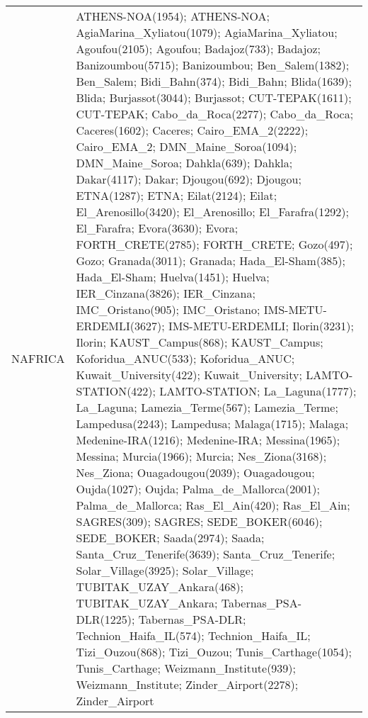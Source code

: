 \documentclass[journal abbreviation, manuscript]{copernicus}
\begin{document}
\begin{table}
\begin{tabularx}{\textwidth}{lX}
                                                                                                                                                                                                                                                                               \\
  NAFRICA   & ATHENS-NOA(1954); ATHENS-NOA; AgiaMarina\_Xyliatou(1079); AgiaMarina\_Xyliatou; Agoufou(2105); Agoufou; Badajoz(733); Badajoz; Banizoumbou(5715); Banizoumbou; Ben\_Salem(1382); Ben\_Salem; Bidi\_Bahn(374); Bidi\_Bahn; Blida(1639); Blida; Burjassot(3044); Burjassot; CUT-TEPAK(1611); CUT-TEPAK; Cabo\_da\_Roca(2277); Cabo\_da\_Roca; Caceres(1602); Caceres; Cairo\_EMA\_2(2222); Cairo\_EMA\_2; DMN\_Maine\_Soroa(1094); DMN\_Maine\_Soroa; Dahkla(639); Dahkla; Dakar(4117); Dakar; Djougou(692); Djougou; ETNA(1287); ETNA; Eilat(2124); Eilat; El\_Arenosillo(3420); El\_Arenosillo; El\_Farafra(1292); El\_Farafra; Evora(3630); Evora; FORTH\_CRETE(2785); FORTH\_CRETE; Gozo(497); Gozo; Granada(3011); Granada; Hada\_El-Sham(385); Hada\_El-Sham; Huelva(1451); Huelva; IER\_Cinzana(3826); IER\_Cinzana; IMC\_Oristano(905); IMC\_Oristano; IMS-METU-ERDEMLI(3627); IMS-METU-ERDEMLI; Ilorin(3231); Ilorin; KAUST\_Campus(868); KAUST\_Campus; Koforidua\_ANUC(533); Koforidua\_ANUC; Kuwait\_University(422); Kuwait\_University; LAMTO-STATION(422); LAMTO-STATION; La\_Laguna(1777); La\_Laguna; Lamezia\_Terme(567); Lamezia\_Terme; Lampedusa(2243); Lampedusa; Malaga(1715); Malaga; Medenine-IRA(1216); Medenine-IRA; Messina(1965); Messina; Murcia(1966); Murcia; Nes\_Ziona(3168); Nes\_Ziona; Ouagadougou(2039); Ouagadougou; Oujda(1027); Oujda; Palma\_de\_Mallorca(2001); Palma\_de\_Mallorca; Ras\_El\_Ain(420); Ras\_El\_Ain; SAGRES(309); SAGRES; SEDE\_BOKER(6046); SEDE\_BOKER; Saada(2974); Saada; Santa\_Cruz\_Tenerife(3639); Santa\_Cruz\_Tenerife; Solar\_Village(3925); Solar\_Village; TUBITAK\_UZAY\_Ankara(468); TUBITAK\_UZAY\_Ankara; Tabernas\_PSA-DLR(1225); Tabernas\_PSA-DLR; Technion\_Haifa\_IL(574); Technion\_Haifa\_IL; Tizi\_Ouzou(868); Tizi\_Ouzou; Tunis\_Carthage(1054); Tunis\_Carthage; Weizmann\_Institute(939); Weizmann\_Institute; Zinder\_Airport(2278); Zinder\_Airport                                                                                                                                                                                                                                                                                                                                                                                                                                                                                                                                                                                                                                                                                                                                                                                                                                                                                                                                                                                                                                                                                                             
\end{tabularx}
\end{table}
\end{document}
